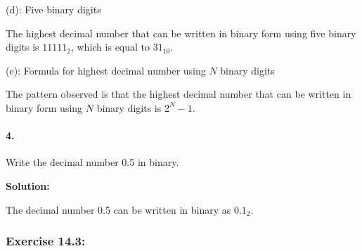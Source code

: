 \documentclass{article}
\begin{document}
\vspace*{0.5cm}

\noindent (d): Five binary digits

\vspace*{0.25cm}

\noindent The highest decimal number that can be written in binary form using five binary digits is $11111_2$, which is equal to $31_{10}$.

\vspace*{0.5cm}

\noindent (e): Formula for highest decimal number using $N$ binary digits

\vspace*{0.25cm}

\noindent The pattern observed is that the highest decimal number that can be written in binary form using $N$ binary digits is $2^N - 1$.

\vspace*{0.5cm}

\paragraph {4.}
Write the decimal number 0.5 in binary.

\vspace*{0.5cm}

\noindent \textbf{Solution:}

\vspace*{0.25cm}

\noindent The decimal number 0.5 can be written in binary as $0.1_2$.

\vspace*{0.5cm}


\newpage

\subsubsection*{Exercise 14.3:}
\end{document}
